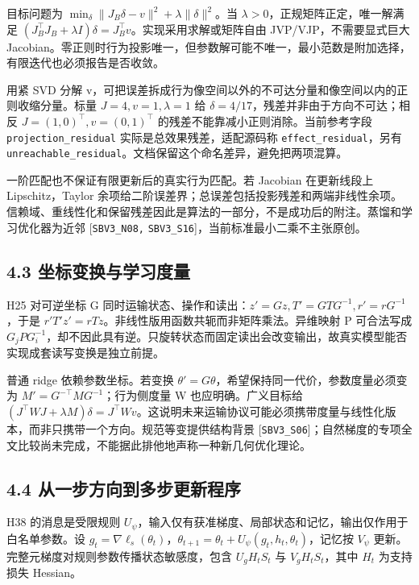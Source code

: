 \documentclass[
  10pt,
]{article}
\begin{document}
目标问题为 \(\min_\delta\|J_B\delta-v\|^2+\lambda\|\delta\|^2\)。当
\(\lambda>0\)，正规矩阵正定，唯一解满足
\((J_B^\top J_B+\lambda I)\delta=J_B^\top v\)。实现采用求解或矩阵自由
JVP/VJP，不需要显式巨大
Jacobian。零正则时行为投影唯一，但参数解可能不唯一，最小范数是附加选择，有限迭代也必须报告是否收敛。

用紧 SVD 分解
v，可把误差拆成行为像空间以外的不可达分量和像空间以内的正则收缩分量。标量
\(J=4,v=1,\lambda=1\) 给 \(\delta=4/17\)，残差并非由于方向不可达；相反
\(J=(1,0)^\top,v=(0,1)^\top\) 的残差不能靠减小正则消除。当前参考字段
\nolinkurl{projection_residual} 实际是总效果残差，适配源码称
\nolinkurl{effect_residual}，另有
\nolinkurl{unreachable_residual}。文档保留这个命名差异，避免把两项混算。

一阶匹配也不保证有限更新后的真实行为匹配。若 Jacobian 在更新线段上
Lipschitz，Taylor
余项给二阶误差界；总误差包括投影残差和两端非线性余项。信赖域、重线性化和保留残差因此是算法的一部分，不是成功后的附注。蒸馏和学习优化器为近邻
{[}\nolinkurl{SBV3_N08,}
\nolinkurl{SBV3_S16}{]}，当前标准最小二乘不主张原创。

\subsection{4.3
坐标变换与学习度量}\label{ux5750ux6807ux53d8ux6362ux4e0eux5b66ux4e60ux5ea6ux91cf}

H25 对可逆坐标 G
同时运输状态、操作和读出：\(z'=Gz,T'=GTG^{-1},r'=rG^{-1}\)，于是
\(r'T'z'=rTz\)。非线性版用函数共轭而非矩阵乘法。异维映射 P 可合法写成
\(G_jPG_i^{-1}\)，却不因此具有逆。只旋转状态而固定读出会改变输出，故真实模型能否实现成套读写变换是独立前提。

普通 ridge 依赖参数坐标。若变换
\(\theta'=G\theta\)，希望保持同一代价，参数度量必须变为
\(M'=G^{-\top}MG^{-1}\)；行为侧度量 W 也应明确。广义目标给
\((J^\top WJ+\lambda M)\delta=J^\top Wv\)。这说明未来运输协议可能必须携带度量与线性化版本，而非只携带一个方向。规范等变提供结构背景
{[}\nolinkurl{SBV3_S06}{]}；自然梯度的专项全文比较尚未完成，不能据此排他地声称一种新几何优化理论。

\subsection{4.4
从一步方向到多步更新程序}\label{ux4eceux4e00ux6b65ux65b9ux5411ux5230ux591aux6b65ux66f4ux65b0ux7a0bux5e8f}

H38 的消息是受限规则
\(U_\psi\)，输入仅有获准梯度、局部状态和记忆，输出仅作用于白名单参数。设
\(g_t=\nabla\ell_s(\theta_t)\)，\(\theta_{t+1}=\theta_t+U_\psi(g_t,h_t,\theta_t)\)，记忆按
\(V_\psi\) 更新。完整元梯度对规则参数传播状态敏感度，包含
\(U_g H_t S_t\) 与 \(V_g H_t S_t\)，其中 \(H_t\) 为支持损失 Hessian。
\end{document}
